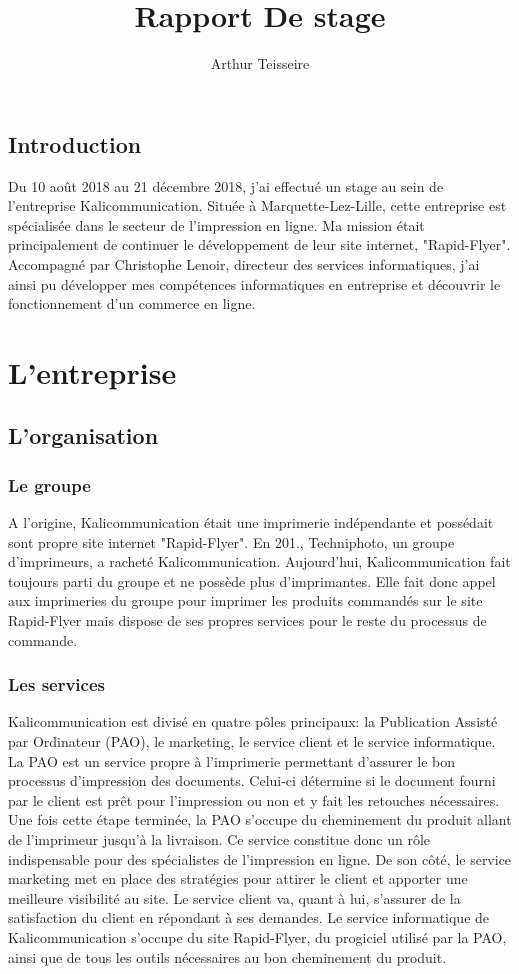 \documentclass[a4paper]{report}
\title{Rapport De stage}
\author{Arthur Teisseire}
\begin{document}
\renewcommand{\contentsname}{Sommaire}
\renewcommand{\thesection}{\arabic{section}}
\tableofcontents
\chapter*{Introduction}
 
Du 10 août 2018 au 21 décembre 2018, j'ai effectué un stage au sein de l'entreprise Kalicommunication.
Située à Marquette-Lez-Lille, cette entreprise est spécialisée dans le secteur de l'impression en ligne.\newline
Ma mission était principalement de continuer le développement de leur site internet, "Rapid-Flyer".
Accompagné par Christophe Lenoir, directeur des services informatiques, j'ai ainsi pu développer mes compétences informatiques en entreprise et découvrir le fonctionnement d'un commerce en ligne.
\part{L'entreprise}
\chapter*{L'organisation}
\section{Le groupe}
A l'origine, Kalicommunication était une imprimerie indépendante et possédait sont propre site internet "Rapid-Flyer".\newline
En 201., Techniphoto, un groupe d'imprimeurs, a racheté Kalicommunication. Aujourd'hui, Kalicommunication fait toujours parti du groupe et ne possède plus d'imprimantes. Elle fait donc appel aux imprimeries du groupe pour imprimer les produits commandés sur le site Rapid-Flyer mais dispose de ses propres services pour le reste du processus de commande.
\section{Les services}
Kalicommunication est divisé en quatre pôles principaux: la Publication Assisté par Ordinateur (PAO), le marketing, le service client et le service informatique.\newline
La PAO est un service propre à l'imprimerie permettant d'assurer le bon processus d'impression des documents. Celui-ci détermine si le document fourni par le client est prêt pour l'impression ou non et y fait les retouches nécessaires. Une fois cette étape terminée, la PAO s'occupe du cheminement du produit allant de l'imprimeur jusqu'à la livraison. Ce service constitue donc un rôle indispensable pour des spécialistes de l'impression en ligne.\newline
De son côté, le service marketing met en place des stratégies pour attirer le client et apporter une meilleure visibilité au site.\newline
Le service client va, quant à lui, s'assurer de la satisfaction du client en répondant à ses demandes.\newline
Le service informatique de Kalicommunication s'occupe du site Rapid-Flyer, du progiciel utilisé par la PAO, ainsi que de tous les outils nécessaires au bon cheminement du produit.
\end{document}
